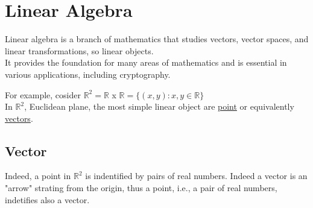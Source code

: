 \section{Linear Algebra}
Linear algebra is a branch of mathematics that studies vectors, vector spaces, and linear transformations, so linear objects.\\ It provides the foundation for many areas of mathematics and is essential in various applications, including cryptography.
\medskip

\noindent
For example, cosider $\mathbb{R}^2 = \mathbb{R}$ x $\mathbb{R} = \{(x,y) : x,y \in \mathbb{R}\}$\\
In $\mathbb{R}^2$, Euclidean plane, the most simple linear object are \underline{point} or equivalently \underline{vectors}.\\
\subsection{Vector}
Indeed, a point in $\mathbb{R}^2$  is indentified by pairs of real numbers. Indeed a vector is an "arrow" strating from the origin, thus a point, i.e., a pair of real numbers, indetifies also a vector.
\medskip

\begin{center}
    

\end{center}

